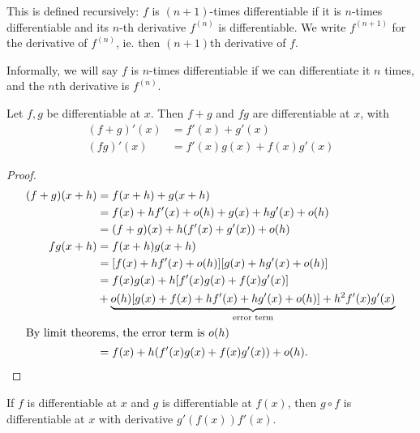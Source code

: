 \documentclass[a4paper]{article}
\begin{document}
\begin{defi}
  This is defined recursively: $f$ is $(n + 1)$-times differentiable if it is $n$-times differentiable and its $n$-th derivative $f^{(n)}$ is differentiable. We write $f^{(n + 1)}$ for the derivative of $f^{(n)}$, ie. then $(n + 1)$th derivative of $f$.

  Informally, we will say $f$ is $n$-times differentiable if we can differentiate it $n$ times, and the $n$th derivative is $f^{(n)}$.
\end{defi}

\begin{lemma}
  Let $f, g$ be differentiable at $x$. Then $f + g$ and $fg$ are differentiable at $x$, with
  \begin{align*}
    (f + g)'(x) &= f'(x) + g'(x)\\
    (fg)'(x) &= f'(x)g(x) + f(x)g'(x)
  \end{align*}
\end{lemma}

\begin{proof}
  \begin{align*}
    (f + g)(x + h) &= f(x + h) + g(x + h)\\
    &= f(x) +hf'(x) + o(h) + g(x) + hg'(x) + o(h)\\
    &= (f + g)(x) + h(f'(x) + g'(x)) + o(h)\\
    fg(x + h) &= f(x + h)g(x + h)\\
    &= [f(x) + hf'(x) + o(h)][g(x) + hg'(x) + o(h)]\\
    &= f(x)g(x) + h[f'(x)g(x) + f(x)g'(x)]\\
    &+ \underbrace{o(h)[g(x) + f(x) + hf'(x) + hg'(x) + o(h)] + h^2f'(x)g'(x)}_{\text{error term}}\\
    \intertext{By limit theorems, the error term is $o(h)$}
    &= f(x) + h(f'(x)g(x) + f(x)g'(x)) + o(h).
  \end{align*}
\end{proof}

\begin{lemma}
  If $f$ is differentiable at $x$ and $g$ is differentiable at $f(x)$, then $g\circ f$ is differentiable at $x$ with derivative $g'(f(x))f'(x)$.
\end{lemma}
\end{document}
